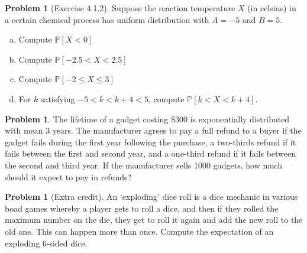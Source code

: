 \documentclass[10pt]{article}
\theoremstyle{definition}
\newtheorem{problem}[theorem]{Problem}
\newcommand{\1}[1]{\textbf{1}_{\left[#1\right]}} %
\def\P{\mathbb{P}} %
\begin{document}
\begin{problem}[Exercise 4.1.2]
  Suppose the reaction temperature $X$ (in celsius) in a certain chemical
  process has uniform distribution with $A=-5$ and $B=5$.
  \begin{enumerate}[(a)]
    \item Compute $\P\left[X<0 \right]$
    \item Compute $\P\left[-2.5<X<2.5 \right]$
    \item Compute $\P\left[-2 \leq X \leq 3\right]$
    \item For $k$ satisfying $-5<k<k+4<5$, compute $\P\left[k<X<k+4 \right]$.
  \end{enumerate}
\end{problem}


\begin{problem}
  The lifetime of a gadget costing \$300 is exponentially distributed with mean 3
  years. The manufacturer agrees to pay a full refund to a buyer if the gadget fails during the first
  year following the purchase, a two-thirds refund if it fails between the first and second year, and a
  one-third refund if it fails between the second and third year.
  If the manufacturer sells 1000 gadgets, how much should it expect to pay in refunds?
\end{problem}


\begin{problem}[Extra credit]
  An `exploding' dice roll is a dice mechanic in various boad games whereby a player gets to roll a dice,
  and then if they rolled the maximum number on the die, they get to roll it again and add the new roll
  to the old one. This can happen more than once. Compute the expectation of an exploding 6-sided dice.
\end{problem}
\end{document}
